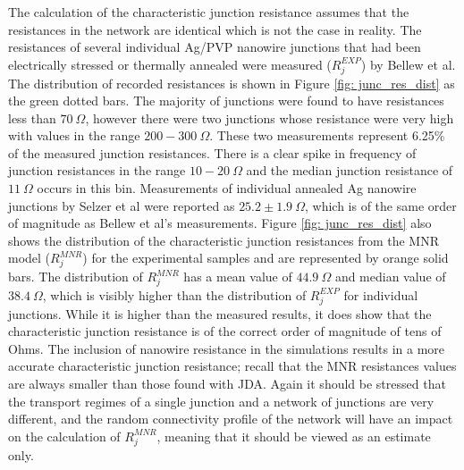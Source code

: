The calculation of the characteristic junction resistance assumes that the resistances in the network are identical which is not the case in reality. The resistances of several individual Ag/PVP nanowire junctions that had been electrically stressed or thermally annealed were measured ($R_j^{EXP}$) by Bellew et al\cite{bellew2015}. The distribution of recorded resistances is shown in Figure \ref{fig: junc_res_dist} as the green dotted bars\cite{bellew2015}. The majority of junctions were found to have resistances less than $70 ~ \Omega$, however there were two junctions whose resistance were very high with values in the range $200 - 300 ~ \Omega$. These two measurements represent 6.25\% of the measured junction resistances. There is a clear spike in frequency of junction resistances in the range $10 - 20 ~ \Omega$ and the median junction resistance of $11 ~ \Omega$ occurs in this bin. Measurements of individual annealed Ag nanowire junctions by Selzer et al were reported as $25.2 \pm 1.9 ~ \Omega$\cite{selzer2016}, which is of the same order of magnitude as Bellew et al's measurements\cite{bellew2015}. Figure \ref{fig: junc_res_dist} also shows the distribution of the characteristic junction resistances from the MNR model ($R_j^{MNR}$) for the experimental samples and are represented by orange solid bars. The distribution of $R_j^{MNR}$ has a mean value of $44.9 ~\Omega$ and median value of $38.4~\Omega$, which is visibly higher than the distribution of $R_j^{EXP}$ for individual junctions. While it is higher than the measured results, it does show that the characteristic junction resistance is of the correct order of magnitude of tens of Ohms. The inclusion of nanowire resistance in the simulations results in a more accurate characteristic junction resistance; recall that the MNR resistances values are always smaller than those found with JDA. Again it should be stressed that the transport regimes of a single junction and a network of junctions are very different, and the random connectivity profile of the network will have an impact on the calculation of $R_j^{MNR}$, meaning that it should be viewed as an estimate only.

